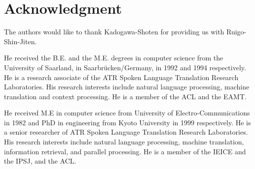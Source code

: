 \section*{Acknowledgment}

The authors would like to thank Kadogawa-Shoten for providing us with Ruigo-Shin-Jiten.

\clearpage




\begin{biography}


{He received the B.E. and the M.E. degrees in computer science from the 
 University of Saarland, in Saarbr\"ucken/Germany, in 1992 and 1994 
respectively.
 He is a research associate of the ATR Spoken Language Translation Research Laboratories.
 His research interests include natural language processing, 
 machine translation and context processing. He is a member of the ACL 
 and the EAMT.
}



{He received M.E in computer science from University of
 Electro-Communications in 1982 and PhD in engineering from Kyoto University
 in 1999 respectively. He is a senior researcher of ATR Spoken Language
 Translation Research Laboratories. His research interests include natural
 language processing, machine translation, information retrieval, and
 parallel processing. He is a member of the IEICE and the IPSJ, and the ACL.
}



\end{biography}




